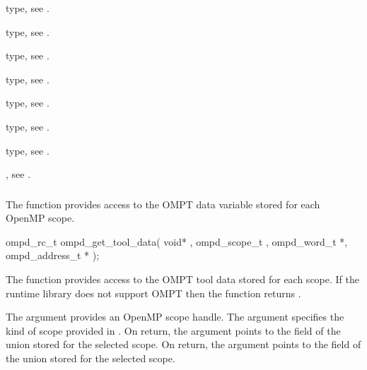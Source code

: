\begin{crossrefs}
\item {} type, 
see .

\item {} type, 
see .

\item {} type, 
see .

\item {} type, see .

\item {} type, see .

\item {} type, see .

\item {} type, see .

\item {}, see .
\end{crossrefs}



\subsubsection{}
\label{subsubsubsec:ompd_get_tool_data}

\summary
The  function provides access to the OMPT data variable 
stored for each OpenMP scope.

\format
\begin{cspecific}
\begin{ompSyntax}
ompd_rc_t ompd_get_tool_data(
  void* , 
  ompd_scope_t ,
  ompd_word_t *,
  ompd_address_t *
);
\end{ompSyntax}
\end{cspecific}

\descr
The  function provides access to the OMPT tool data
stored for each scope. If the runtime library does not support OMPT then the 
function returns .

\argdesc
The  argument provides an OpenMP scope handle. The  
argument specifies the kind of scope provided in . On return, 
the  argument points to the  field of the  
union stored for the selected scope. On return, the  argument points to 
the   field of the  union stored for the selected scope.

